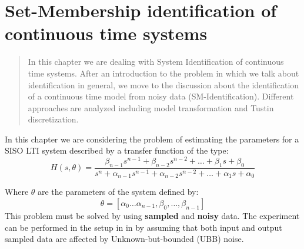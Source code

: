 \chapter[SM-ID of Continuous time systems]{Set-Membership identification of continuous time systems}

\begin{quotation}
    \noindent
    \textsf{In this chapter we are dealing with System Identification of continuous time systems. After an introduction to the problem in which we talk about identification in general, we move to the discussion about the identification of a continuous time model from noisy data (SM-Identification). Different approaches are analyzed including model transformation and Tustin discretization.}
\end{quotation}

\noindent
In this chapter we are considering the problem of estimating the parameters for a SISO LTI system described by a transfer function of the type:
\begin{equation}\label{eq:ct_model}
    H(s,\theta)=\frac{
        \beta_{n-1}{s^{n-1}}+\beta_{n-2}s^{n-2}+\dots+\beta_1{s}+\beta_0
    }{
        s^n+\alpha_{n-1}s^{n-1}+\alpha_{n-2}s^{n-2}+\dots+\alpha_1{s}+\alpha_0
    }
\end{equation}

\noindent
Where $\theta$ are the parameters of the system defined by:
\begin{equation}
    \theta=[\alpha_0\dots\alpha_{n-1},\beta_0,\dots,\beta_{n-1}]
\end{equation}
This problem must be solved by using \textbf{sampled} and \textbf{noisy} data. The experiment can be performed in the setup in  in  by assuming that both input and output sampled data are affected by Unknown-but-bounded (UBB) noise.


